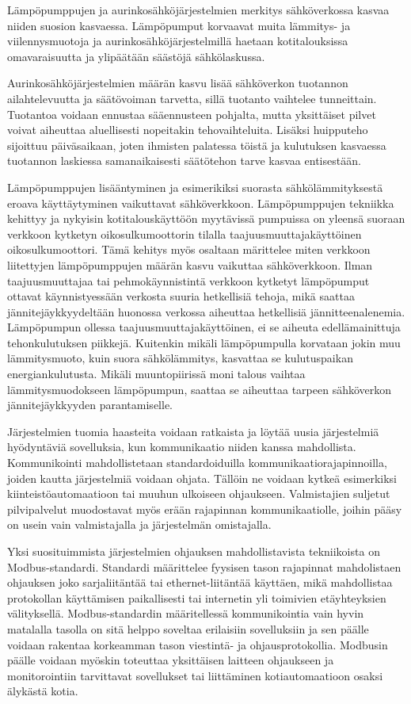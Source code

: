 Lämpöpumppujen ja aurinkosähköjärjestelmien merkitys sähköverkossa kasvaa niiden suosion kasvaessa. Lämpöpumput korvaavat muita lämmitys- ja viilennysmuotoja ja aurinkosähköjärjestelmillä haetaan kotitalouksissa omavaraisuutta ja ylipäätään säästöjä sähkölaskussa. 

Aurinkosähköjärjestelmien määrän kasvu lisää sähköverkon tuotannon ailahtelevuutta ja säätövoiman tarvetta, sillä tuotanto vaihtelee tunneittain. Tuotantoa voidaan ennustaa sääennusteen pohjalta, mutta yksittäiset pilvet voivat aiheuttaa aluellisesti nopeitakin tehovaihteluita. Lisäksi huipputeho sijoittuu päiväsaikaan, joten ihmisten palatessa töistä ja kulutuksen kasvaessa tuotannon laskiessa samanaikaisesti säätötehon tarve kasvaa entisestään. 

Lämpöpumppujen lisääntyminen ja esimerikiksi suorasta sähkölämmityksestä eroava käyttäytyminen vaikuttavat sähköverkkoon. Lämpöpumppujen tekniikka kehittyy ja nykyisin kotitalouskäyttöön myytävissä pumpuissa on yleensä suoraan verkkoon kytketyn oikosulkumoottorin tilalla taajuusmuuttajakäyttöinen oikosulkumoottori. Tämä kehitys myös osaltaan märittelee miten verkkoon liitettyjen lämpöpumppujen määrän kasvu vaikuttaa sähköverkkoon. Ilman taajuusmuuttajaa tai pehmokäynnistintä verkkoon kytketyt lämpöpumput ottavat käynnistyessään verkosta suuria hetkellisiä tehoja, mikä saattaa jännitejäykkyydeltään huonossa verkossa aiheuttaa hetkellisiä jännitteenalenemia. Lämpöpumpun ollessa taajuusmuuttajakäyttöinen, ei se aiheuta edellämainittuja tehonkulutuksen piikkejä. Kuitenkin mikäli lämpöpumpulla korvataan jokin muu lämmitysmuoto, kuin suora sähkölämmitys, kasvattaa se kulutuspaikan energiankulutusta. Mikäli muuntopiirissä moni talous vaihtaa lämmitysmuodokseen lämpöpumpun, saattaa se aiheuttaa tarpeen sähköverkon jännitejäykkyyden parantamiselle.

Järjestelmien tuomia haasteita voidaan ratkaista ja löytää uusia järjestelmiä hyödyntäviä sovelluksia, kun kommunikaatio niiden kanssa mahdollista. Kommunikointi mahdollistetaan standardoiduilla kommunikaatiorajapinnoilla, joiden kautta järjestelmiä voidaan ohjata. Tällöin ne voidaan kytkeä esimerkiksi kiinteistöautomaatioon tai muuhun ulkoiseen ohjaukseen. Valmistajien suljetut pilvipalvelut muodostavat myös erään rajapinnan kommunikaatiolle, joihin pääsy on usein vain valmistajalla ja järjestelmän omistajalla. 

Yksi suosituimmista järjestelmien ohjauksen mahdollistavista tekniikoista on Modbus-standardi. Standardi määrittelee fyysisen tason rajapinnat mahdolistaen ohjauksen joko sarjaliitäntää tai ethernet-liitäntää käyttäen, mikä mahdollistaa protokollan käyttämisen paikallisesti tai internetin yli toimivien etäyhteyksien välityksellä. Modbus-standardin määritellessä kommunikointia vain hyvin matalalla tasolla on sitä helppo soveltaa erilaisiin sovelluksiin ja sen päälle voidaan rakentaa korkeamman tason viestintä- ja ohjausprotokollia. Modbusin päälle voidaan myöskin toteuttaa yksittäisen laitteen ohjaukseen ja monitorointiin tarvittavat sovellukset tai liittäminen kotiautomaatioon osaksi älykästä kotia. 

